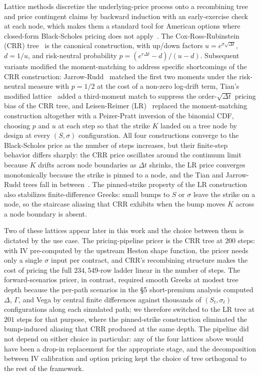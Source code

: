 Lattice methods discretize the underlying-price process onto a recombining tree and price contingent claims by backward induction with an early-exercise check at each node, which makes them a standard tool for American options where closed-form Black-Scholes pricing does not apply~\cite{broadie1996}. The Cox-Ross-Rubinstein (CRR) tree~\cite{cox1979} is the canonical construction, with up/down factors $u = e^{\sigma\sqrt{\Delta t}}$, $d = 1/u$, and risk-neutral probability $p = (e^{r\Delta t} - d)/(u - d)$. Subsequent variants modified the moment-matching to address specific shortcomings of the CRR construction: Jarrow-Rudd~\cite{jarrow1983} matched the first two moments under the risk-neutral measure with $p = 1/2$ at the cost of a non-zero log-drift term, Tian's modified lattice~\cite{tian1993} added a third-moment match to suppress the order-$\sqrt{\Delta t}$ pricing bias of the CRR tree, and Leisen-Reimer (LR)~\cite{leisen1996} replaced the moment-matching construction altogether with a Peizer-Pratt inversion of the binomial CDF, choosing $p$ and $u$ at each step so that the strike $K$ landed on a tree node by design at every $(S, \sigma)$ configuration. All four constructions converge to the Black-Scholes price as the number of steps increases, but their finite-step behavior differs sharply: the CRR price oscillates around the continuum limit because $K$ drifts across node boundaries as $\Delta t$ shrinks, the LR price converges monotonically because the strike is pinned to a node, and the Tian and Jarrow-Rudd trees fall in between~\cite{leisen1996,broadie1996}. The pinned-strike property of the LR construction also stabilizes finite-difference Greeks: small bumps to $S$ or $\sigma$ leave the strike on a node, so the staircase aliasing that CRR exhibits when the bump moves $K$ across a node boundary is absent.

Two of these lattices appear later in this work and the choice between them is dictated by the use case. The pricing-pipeline pricer is the CRR tree at $200$ steps: with IV pre-computed by the upstream Heston shape function, the pricer needs only a single $\sigma$ input per contract, and CRR's recombining structure makes the cost of pricing the full $234{,}549$-row ladder linear in the number of steps. The forward-scenarios pricer, in contrast, required smooth Greeks at modest tree depth because the per-path scenarios in the §5 short-premium analysis computed $\Delta$, $\Gamma$, and Vega by central finite differences against thousands of $(S_t, \sigma_t)$ configurations along each simulated path; we therefore switched to the LR tree at $201$ steps for that purpose, where the pinned-strike construction eliminated the bump-induced aliasing that CRR produced at the same depth. The pipeline did not depend on either choice in particular: any of the four lattices above would have been a drop-in replacement for the appropriate stage, and the decomposition between IV calibration and option pricing kept the choice of tree orthogonal to the rest of the framework.

